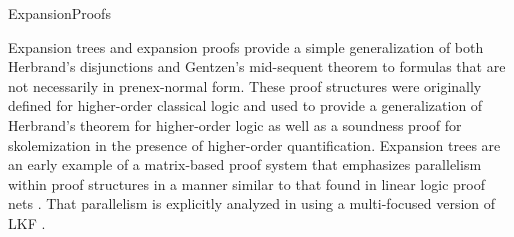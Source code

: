 \begin{entry}{ExpansionProofs}
\begin{history}
Expansion trees and expansion proofs \cite{miller87sl,miller83}
provide a simple generalization of both Herbrand's disjunctions and
Gentzen's mid-sequent theorem to formulas that are not necessarily in
prenex-normal form.  These proof structures were originally defined
for higher-order classical logic and used to provide a generalization
of Herbrand's theorem for higher-order logic as well as a soundness
proof for skolemization in the presence of higher-order
quantification.  Expansion trees are an early example of a
matrix-based proof system that emphasizes parallelism within proof
structures in a manner similar to that found in linear logic proof
nets \cite{girard87tcs}.  That parallelism is explicitly analyzed
in \cite{chaudhuri14jlc} using a multi-focused version of
LKF .
\end{history}











\end{entry}
